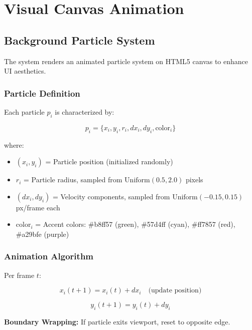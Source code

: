 \documentclass[10pt]{article}
\begin{document}
\section{Visual Canvas Animation}

\subsection{Background Particle System}

The system renders an animated particle system on HTML5 canvas to enhance UI aesthetics.

\subsubsection{Particle Definition}

Each particle $p_i$ is characterized by:

\begin{equation}
p_i = \{x_i, y_i, r_i, dx_i, dy_i, \text{color}_i\}
\end{equation}

where:
\begin{itemize}
    \item $(x_i, y_i)$ = Particle position (initialized randomly)
    \item $r_i$ = Particle radius, sampled from $\text{Uniform}(0.5, 2.0)$ pixels
    \item $(dx_i, dy_i)$ = Velocity components, sampled from $\text{Uniform}(-0.15, 0.15)$ px/frame each
    \item $\text{color}_i$ = Accent colors: \#b8ff57 (green), \#57d4ff (cyan), \#ff7857 (red), \#a29bfe (purple)
\end{itemize}

\subsubsection{Animation Algorithm}

Per frame $t$:

\begin{equation}
x_i(t+1) = x_i(t) + dx_i \quad \text{(update position)}
\end{equation}

\begin{equation}
y_i(t+1) = y_i(t) + dy_i
\end{equation}

\textbf{Boundary Wrapping:} If particle exits viewport, reset to opposite edge.
\end{document}
